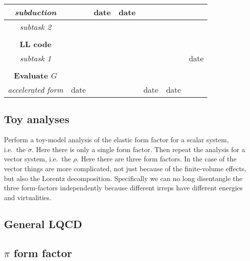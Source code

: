 \begin{center}
\begin{tabular}{ c | c | c | c | c | c | c  }
{\em subduction}      &                      & date              & date                &                   &                     &                        \\ \hline
{\em subtask 2}        &                      &                      &                        &                   &                     &                       \\ \hline \\[-10pt] \hline  
%
{\bf LL code}       &                            &                      &                        &                   &                     &                      \\ \hline
{\em subtask 1}  &                            &                      &                        &                   &                     & date               \\ \hline \\[-10pt] \hline
%
{\bf Evaluate $G$}  &                        &                      &                        &                   &                     &                      \\ \hline
{\em accelerated form} & date          &                      &                        & date           & date            &                      \\ \hline  
%
\end{tabular}
\end{center}

\subsection{Toy analyses}

Perform a toy-model analysis of  the elastic form factor for a scalar system, i.e.~the $\sigma$. Here there is only a single form factor. Then repeat the analysis for a vector system, i.e.~the $\rho$. Here there are three form factors. In the case of the vector things are more complicated, not just because of the finite-volume effects, but also the Lorentz decomposition. Specifically we can no long disentangle the three form-factors independently because different irreps have different energies and virtualities.

\subsection{General LQCD}

\subsection{$\pi$ form factor}

